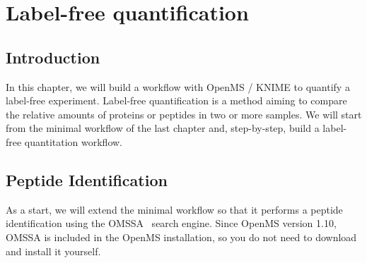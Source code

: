 
\newpage
\section{Label-free quantification}
\label{sec:lfq}

\subsection{Introduction}

In this chapter, we will build a workflow with OpenMS / KNIME to quantify a label-free experiment. 
Label-free quantification is a method aiming to compare the relative amounts of proteins or peptides in two or more samples.
We will start from the minimal workflow of the last chapter and, step-by-step, build a label-free quantitation workflow.

\subsection{Peptide Identification}
\label{Peptide_Identification}

As a start, we will extend the minimal workflow so that it performs a peptide identification using the OMSSA~\cite{Geer:2004p285} search engine. Since OpenMS version 1.10, OMSSA is included in the OpenMS installation, so you do not need to download and install it yourself.

